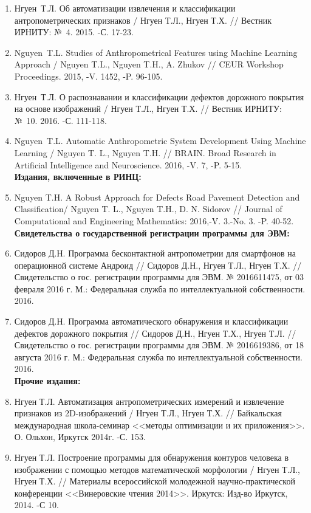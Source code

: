 \begin{enumerate}
	\item Нгуен~Т.Л. Об автоматизации извлечения и классификации антропометрических признаков / Нгуен Т.Л., Нгуен Т.Х. // Вестник ИРНИТУ: №~4. 2015. -С. 17-23.
	\item  Nguyen~T.L. Studies of Anthropometrical Features using Machine Learning Approach / Nguyen T.L., Nguyen T.H., A. Zhukov // CEUR Workshop Proceedings. 2015, -V. 1452, -P. 96-105.
	\item Нгуен~Т.Л. О распознавании и классификации дефектов дорожного покрытия на основе изображений / Нгуен Т.Л., Нгуен Т.Х. // Вестник ИРНИТУ: №~10. 2016. -С. 111-118.
	\item Nguyen~T.L. Automatic Anthropometric System Development Using Machine Learning / Nguyen T. L., Nguyen T.H. // BRAIN. Broad Research in Artificial Intelligence and Neuroscience. 2016, -V. 7, -P. 5-15.\\
	\textbf{Издания, включенные в РИНЦ:}
	\item Nguyen T.H. A Robust Approach for Defects Road Pavement Detection and Classification/ Nguyen T. L., Nguyen T.H., D. N. Sidorov // Journal of Computational and Engineering Mathematics: 2016,-V. 3.-No. 3. -P. 40-52.\\
	\textbf{Свидетельства о государственной регистрации программы для ЭВМ:}
	\item  Сидоров Д.Н. Программа бесконтактной антропометрии для смартфонов на операционной системе Андроид // Сидоров Д.Н., Нгуен Т.Л., Нгуен Т.Х. // Свидетельство о гос. регистрации программы для ЭВМ. № 2016611475, от 03 февраля 2016 г. М.: Федеральная служба по интеллектуальной собственности. 2016.
	\item  Сидоров Д.Н. Программа автоматического обнаружения и классификации дефектов дорожного покрытия // Сидоров Д.Н.,  Нгуен Т.Х., Нгуен Т.Л. // Свидетельство о гос. регистрации программы для ЭВМ. № 2016619386, от 18 августа  2016 г. М.: Федеральная служба по интеллектуальной собственности. 2016.\\
\textbf{Прочие издания:}
\item  Нгуен Т.Л. Автоматизация антропометрических измерений и извлечение признаков из 2D-изображений / Нгуен Т.Л., Нгуен Т.Х. // Байкальская международная школа-семинар <<методы оптимизации и их приложения>>. О. Ольхон, Иркутск 2014г. -С. 153.
\item Нгуен Т.Л. Построение программы для обнаружения контуров человека в изображении с помощью методов математической морфологии / Нгуен Т.Л., Нгуен Т.Х. // Материалы всероссийской молодежной научно-практической конференции <<Винеровские чтения 2014>>. Иркутск: Изд-во Иркутск, 2014. -С 10.

\end{enumerate}
